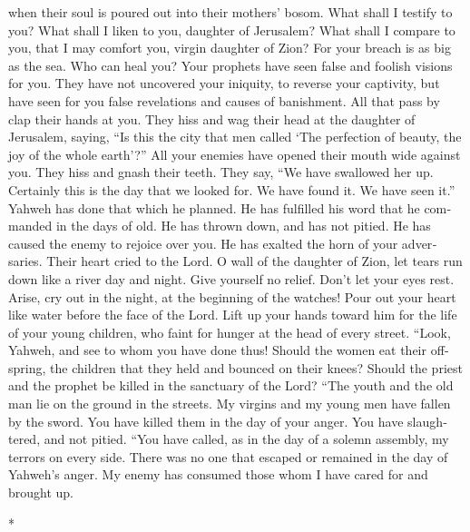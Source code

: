 \begin{paracol}{2}
\begin{otherlanguage}{english}
when their soul is poured out into their mothers' bosom. 
What shall I testify to you? What shall I liken to you, daughter of
Jerusalem? What shall I compare to you, that I may comfort you, virgin
daughter of Zion? For your breach is as big as the sea. Who can heal
you?  Your prophets have seen false and foolish visions
for you. They have not uncovered your iniquity, to reverse your
captivity, but have seen for you false revelations and causes of
banishment.  All that pass by clap their hands at you.
They hiss and wag their head at the daughter of Jerusalem, saying, ``Is
this the city that men called `The perfection of beauty, the joy of the
whole earth'?''  All your enemies have opened their mouth
wide against you. They hiss and gnash their teeth. They say, ``We have
swallowed her up. Certainly this is the day that we looked for. We have
found it. We have seen it.''  Yahweh has done that which
he planned. He has fulfilled his word that he commanded in the days of
old. He has thrown down, and has not pitied. He has caused the enemy to
rejoice over you. He has exalted the horn of your adversaries.
 Their heart cried to the Lord. O wall of the daughter of
Zion, let tears run down like a river day and night. Give yourself no
relief. Don't let your eyes rest.  Arise, cry out in the
night, at the beginning of the watches! Pour out your heart like water
before the face of the Lord. Lift up your hands toward him for the life
of your young children, who faint for hunger at the head of every
street.  ``Look, Yahweh, and see to whom you have done
thus! Should the women eat their offspring, the children that they held
and bounced on their knees? Should the priest and the prophet be killed
in the sanctuary of the Lord?  ``The youth and the old
man lie on the ground in the streets. My virgins and my young men have
fallen by the sword. You have killed them in the day of your anger. You
have slaughtered, and not pitied.  ``You have called, as
in the day of a solemn assembly, my terrors on every side. There was no
one that escaped or remained in the day of Yahweh's anger. My enemy has
consumed those whom I have cared for and brought up.

\end{otherlanguage}

\switchcolumn[0]*

\hypertarget{queja-desesperada-de-un-solo-compauxf1ero-nacional-por-los-difuxedciles-juicios-sufridos-pide-gracia-y-esperanza-por-una-nueva-salvaciuxf3n}{%
}
\end{paracol}
